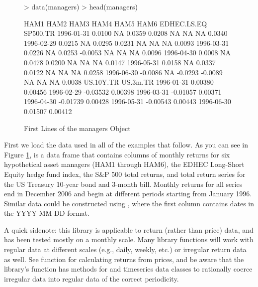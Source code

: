 \documentclass[12pt,letterpaper,english]{article}
\begin{document}
%
\begin{figure}

\caption{First Lines of the managers Object }

\label{fig:First-Lines-of}

\begin{Schunk}
\begin{Sinput}
> data(managers)
> head(managers)
\end{Sinput}
\begin{Soutput}
              HAM1 HAM2    HAM3    HAM4 HAM5 HAM6 EDHEC.LS.EQ SP500.TR
1996-01-31  0.0100   NA  0.0359  0.0208   NA   NA          NA   0.0340
1996-02-29  0.0215   NA  0.0295  0.0231   NA   NA          NA   0.0093
1996-03-31  0.0226   NA  0.0253 -0.0053   NA   NA          NA   0.0096
1996-04-30  0.0008   NA  0.0478  0.0200   NA   NA          NA   0.0147
1996-05-31  0.0158   NA  0.0337  0.0122   NA   NA          NA   0.0258
1996-06-30 -0.0086   NA -0.0293 -0.0089   NA   NA          NA   0.0038
           US.10Y.TR US.3m.TR
1996-01-31   0.00380  0.00456
1996-02-29  -0.03532  0.00398
1996-03-31  -0.01057  0.00371
1996-04-30  -0.01739  0.00428
1996-05-31  -0.00543  0.00443
1996-06-30   0.01507  0.00412
\end{Soutput}
\end{Schunk}
\end{figure}


First we load the data used in all of the examples that follow. As
you can see in Figure \ref{fig:First-Lines-of}, 
is a data frame that contains columns of monthly returns for six hypothetical
asset managers (HAM1 through HAM6), the EDHEC Long-Short Equity hedge
fund index, the S\&P 500 total returns, and total return series for
the US Treasury 10-year bond and 3-month bill. Monthly returns for
all series end in December 2006 and begin at different periods starting
from January 1996. Similar data could be constructed using , where the first column contains dates in the YYYY-MM-DD
format.

A quick sidenote: this library is applicable to return (rather than
price) data, and has been tested mostly on a monthly scale. Many library
functions will work with regular data at different scales (e.g., daily,
weekly, etc.) or irregular return data as well. See function 
for calculating returns from prices, and be aware that the 
library's  function has methods for 
and  timeseries data classes to rationally coerce irregular
data into regular data of the correct periodicity.
\end{document}
